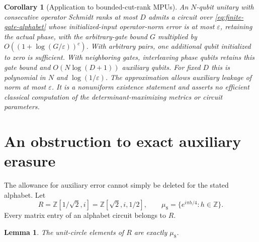 \documentclass[11pt]{article}
\newtheorem{lemma}[theorem]{Lemma}
\newtheorem{corollary}[theorem]{Corollary}
\begin{document}
\begin{corollary}[Application to bounded-cut-rank MPUs]
An $N$-qubit unitary with consecutive operator Schmidt ranks at most $D$
admits a circuit over \eqref{eq:finite-gate-alphabet} whose initialized-input
operator-norm error is at most $\varepsilon$, retaining the actual phase,
with the arbitrary-gate bound $G$ multiplied by
$O((1+\log(G/\varepsilon))^c)$. With arbitrary pairs, one additional qubit initialized to zero is
sufficient. With neighboring gates, interleaving phase qubits
retains this gate bound and $O(N\log(D+1))$ auxiliary qubits. For fixed $D$
this is polynomial in $N$ and $\log(1/\varepsilon)$.
The approximation allows auxiliary leakage of norm at most $\varepsilon$.
It is a nonuniform existence statement and asserts no efficient classical
computation of the determinant-maximizing metrics or circuit parameters.
\end{corollary}

\section{An obstruction to exact auxiliary erasure}

The allowance for auxiliary error cannot simply be deleted for the stated
alphabet. Let
\begin{equation}
 R=\mathbb Z[1/\sqrt2,i]=\mathbb Z[\sqrt2,i,1/2],\qquad
 \mu_8=\{e^{i\pi h/4}:h\in\mathbb Z\}.
\end{equation}
Every matrix entry of an alphabet circuit belongs to $R$.

\begin{lemma}\label{lem:finite-gate-ring-unit-circle}
The unit-circle elements of $R$ are exactly $\mu_8$.
\end{lemma}
\end{document}
